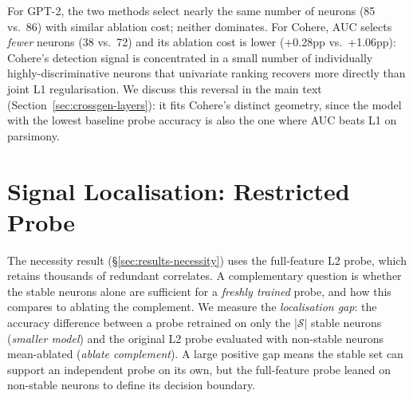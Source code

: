 \documentclass[11pt]{article}
\begin{document}
For GPT-2, the two methods select nearly the same number of neurons (85 vs.\ 86) with similar ablation cost; neither dominates. For Cohere, AUC selects \emph{fewer} neurons (38 vs.\ 72) and its ablation cost is lower (+0.28pp vs.\ +1.06pp): Cohere's detection signal is concentrated in a small number of individually highly-discriminative neurons that univariate ranking recovers more directly than joint L1 regularisation. We discuss this reversal in the main text (Section~\ref{sec:crossgen-layers}): it fits Cohere's distinct geometry, since the model with the lowest baseline probe accuracy is also the one where AUC beats L1 on parsimony.

\section{Signal Localisation: Restricted Probe}
\label{app:restricted}

The necessity result (§\ref{sec:results-necessity}) uses the full-feature L2 probe, which retains thousands of redundant correlates. A complementary question is whether the stable neurons alone are sufficient for a \textit{freshly trained} probe, and how this compares to ablating the complement. We measure the \textit{localisation gap}: the accuracy difference between a probe retrained on only the $|\mathcal{S}|$ stable neurons (\textit{smaller model}) and the original L2 probe evaluated with non-stable neurons mean-ablated (\textit{ablate complement}). A large positive gap means the stable set can support an independent probe on its own, but the full-feature probe leaned on non-stable neurons to define its decision boundary.

\begin{table}[!htbp]
\centering
{}
\caption{Restricted probe results. \textit{Smaller model}: L2 probe retrained on only the $|\mathcal{S}|$ stable neurons. \textit{Gap}: smaller-model accuracy minus ablate-complement accuracy (positive = stable neurons self-sufficient; larger = more dependence on non-stable neurons in the full-feature probe). 15-cell means $\pm$ std.}
\label{tab:restricted-probe}
\end{table}
\end{document}
